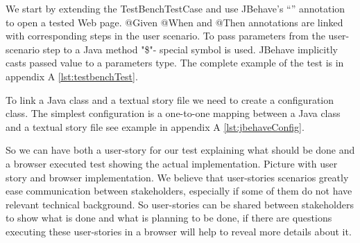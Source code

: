 We start by extending the TestBenchTestCase  and use JBehave's ``\@BeforeScenario''
annotation to open a tested Web page.  @Given @When and @Then annotations are
linked with corresponding steps in the user scenario.
To pass parameters from the user-scenario step to a Java method "\$"- special symbol is used.
JBehave implicitly casts passed value to a parameters type. The complete example
of the test is in appendix A \ref{lst:testbenchTest}.

To link a Java class and a textual story file we need to create a configuration class.
The simplest configuration is a one-to-one mapping between a Java class and a textual story file
see example in appendix A \ref{lst:jbehaveConfig}. 

So we can have both a user-story for our test explaining what should be done and a browser executed
test showing the actual implementation. Picture with user story and browser implementation. We believe that user-stories 
scenarios greatly ease communication between stakeholders, 
especially if some of them do not have relevant technical background.
So user-stories can be shared between stakeholders to show what is done and what
is planning to be done, if there are questions 
executing these user-stories in a browser will help to reveal more details about it. 
   

    
